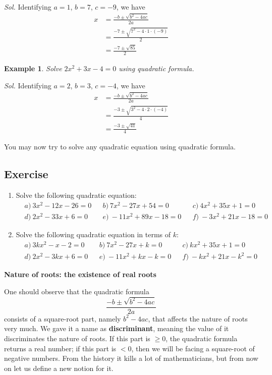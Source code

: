 \documentclass[12pt]{article}
\newtheorem{example}{Example}
\begin{document}
    \textit{ Sol.} Identifying $a=1$, $b=7$, $c=-9$, we have \begin{align*}
        x&=\frac{-b\pm\sqrt{b^2-4ac}}{2a}\\
        &=\frac{-7\pm\sqrt{7^2-4\cdot 1\cdot (-9)}}{2}\\
        &=\frac{-7\pm\sqrt{85}}{2}
    \end{align*}

    \begin{example}
        Solve $2x^2+3x-4=0$ using quadratic formula.
    \end{example}

    \textit{ Sol.} Identifying $a=2$, $b=3$, $c=-4$, we have \begin{align*}
        x&=\frac{-b\pm\sqrt{b^2-4ac}}{2a}\\
        &=\frac{-3\pm\sqrt{3^2-4\cdot 2\cdot (-4)}}{4}\\
        &=\frac{-3\pm\sqrt{41}}{4}
    \end{align*}

    You may now try to solve any quadratic equation using quadratic formula.

    \subsection*{Exercise}

    \begin{enumerate}
        \item Solve the following quadratic equation:\begin{align*}
            &a)\ 3x^2-12x-26=0&&b)\ 7x^2-27x+54=0&&c)\ 4x^2+35x+1=0\\
            &d)\ 2x^2-33x+6=0&&e)\ -11x^2+89x-18=0&&f)\ -3x^2+21x-18=0
        \end{align*}
        \item Solve the following quadratic equation in terms of $k$:\begin{align*}
            &a)\ 3kx^2-x-2=0&&b)\ 7x^2-27x+k=0&&c)\ kx^2+35x+1=0\\
            &d)\ 2x^2-3kx+6=0&&e)\ -11x^2+kx-k=0&&f)\ -kx^2+21x-k^2=0
        \end{align*}
    \end{enumerate}

    \begin{center}
        \textbf{Nature of roots: the existence of real roots}
    \end{center}

    One should observe that the quadratic formula $$\frac{-b\pm \sqrt{b^2-4ac}}{2a}$$ consists of a square-root part, namely $b^2-4ac$, that affects the nature of roots very much. We gave it a name as \textbf{discriminant}, meaning the value of it discriminates the nature of roots. If this part is $\geq 0$, the quadratic formula returns a real number; if this part is $< 0$, then we will be facing a square-root of negative numbers. From the history it kills a lot of mathematicians, but from now on let us define a new notion for it.
\end{document}
